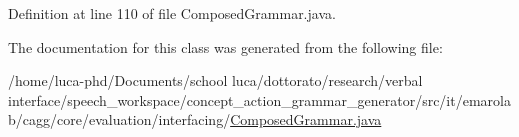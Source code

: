 Definition at line 110 of file Composed\-Grammar.\-java.



The documentation for this class was generated from the following file\-:\begin{DoxyCompactItemize}
\item 
/home/luca-\/phd/\-Documents/school luca/dottorato/research/verbal interface/speech\-\_\-workspace/concept\-\_\-action\-\_\-grammar\-\_\-generator/src/it/emarolab/cagg/core/evaluation/interfacing/\hyperlink{ComposedGrammar_8java}{Composed\-Grammar.\-java}\end{DoxyCompactItemize}
